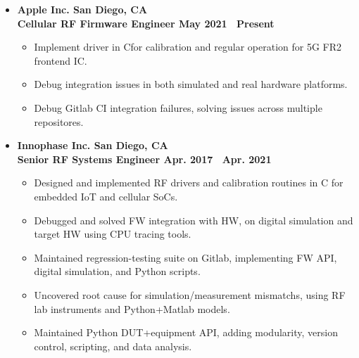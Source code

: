 \documentclass[10pt, letterpaper]{letter}
\def\myplus{\hspace{-.3em}\raisebox{.4ex}{ \tiny +}}
\def\cpp{C\myplus\myplus}
\begin{document}
\begin{itemize}[label=, leftmargin=0em]

    \item
    \textbf{Apple Inc. \hfill San Diego, CA}\vspace{2pt}\\
    \textbf{Cellular RF Firmware Engineer \hfill May 2021 \textendash\ Present}\vspace{2pt}
    \begin{itemize}[nosep, leftmargin=1.15em]
        \item Implement driver in \cpp for calibration and regular operation for 5G FR2 frontend IC.  
        \item Debug integration issues in both simulated and real hardware platforms.
        \item Debug Gitlab CI integration failures, solving issues across multiple repositores.
    \end{itemize}

\vfill

    \item
    \textbf{Innophase Inc. \hfill San Diego, CA}\vspace{2pt}\\
    \textbf{Senior RF Systems Engineer \hfill Apr. 2017 \textendash\ Apr. 2021}\vspace{2pt}
    \begin{itemize}[nosep, leftmargin=1.15em]
        \item Designed and implemented RF drivers and calibration routines in C for embedded IoT and cellular SoCs.
        \item Debugged and solved FW integration with HW, on digital simulation and target HW using CPU tracing tools.
        \item Maintained regression-testing suite on Gitlab, implementing FW API, digital simulation, and Python scripts.
        \item Uncovered root cause for simulation/measurement mismatchs, using RF lab instruments and Python+Matlab models.
        \item Maintained Python DUT+equipment API, adding modularity, version control, scripting, and data analysis.
    \end{itemize}


\end{itemize}
\end{document}
